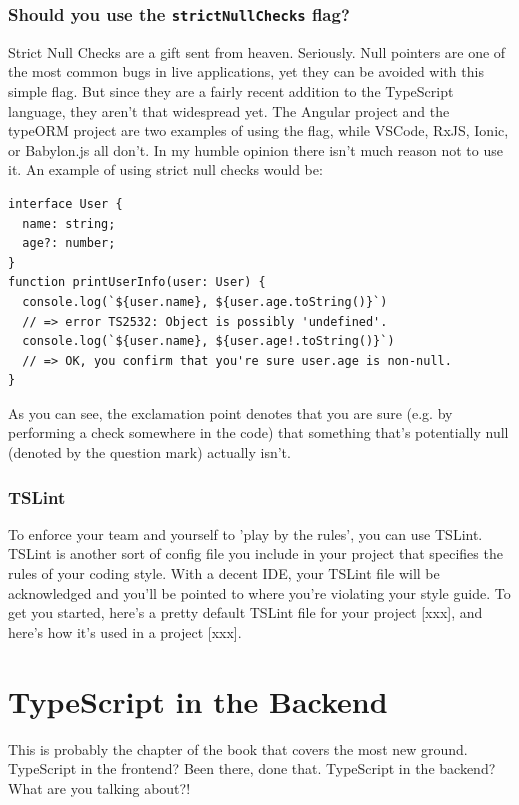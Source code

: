 \documentclass[12pt,a4paper]{report}
\begin{document}
\subsection{Should you use the \texttt{strictNullChecks} flag?}
Strict Null Checks are a gift sent from heaven. Seriously. Null pointers are one of the most common bugs in live applications, yet they can be avoided with this simple flag. But since they are a fairly recent addition to the TypeScript language, they aren't that widespread yet. The Angular project and the typeORM project are two examples of using the flag, while VSCode, RxJS, Ionic, or Babylon.js all don't. In my humble opinion there isn't much reason not to use it. An example of using strict null checks would be:
\begin{lstlisting}
interface User {
  name: string;
  age?: number;
}
function printUserInfo(user: User) {
  console.log(`${user.name}, ${user.age.toString()}`)
  // => error TS2532: Object is possibly 'undefined'.
  console.log(`${user.name}, ${user.age!.toString()}`)
  // => OK, you confirm that you're sure user.age is non-null.
}
\end{lstlisting}
As you can see, the exclamation point denotes that you are sure (e.g. by performing a check somewhere in the code) that something that's potentially null (denoted by the question mark) actually isn't.

\subsection{TSLint}
To enforce your team and yourself to 'play by the rules', you can use TSLint. TSLint is another sort of config file you include in your project that specifies the rules of your coding style. With a decent IDE, your TSLint file will be acknowledged and you'll be pointed to where you're violating your style guide. To get you started, here's a pretty default TSLint file for your project [xxx], and here's how it's used in a project [xxx].

\chapter{TypeScript in the Backend}

This is probably the chapter of the book that covers the most new ground. TypeScript in the frontend? Been there, done that. TypeScript in the backend? What are you talking about?!
\end{document}
